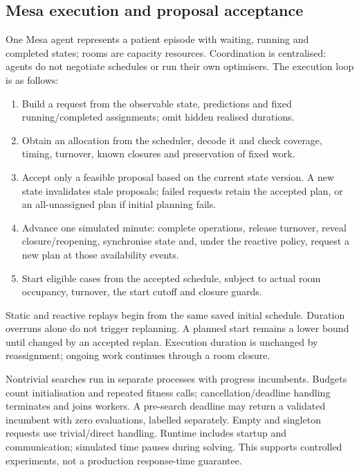 \subsection{Mesa execution and proposal acceptance}
\label{sec:coupling}

One Mesa agent represents a patient episode with waiting, running and
completed states; rooms are capacity resources. Coordination is centralised:
agents do not negotiate schedules or run their own optimisers. The execution
loop is as follows:
\begin{enumerate}
\item Build a request from the observable state, predictions and fixed
      running/completed assignments; omit hidden realised durations.
\item Obtain an allocation from the scheduler, decode it and check coverage,
      timing, turnover, known closures and preservation of fixed work.
\item Accept only a feasible proposal based on the current state version.
      A new state invalidates stale proposals; failed requests retain the
      accepted plan, or an all-unassigned plan if initial planning fails.
\item Advance one simulated minute: complete operations, release turnover,
      reveal closure/reopening, synchronise state and, under the reactive
      policy, request a new plan at those availability events.
\item Start eligible cases from the accepted schedule, subject to actual
      room occupancy, turnover, the start cutoff and closure guards.
\end{enumerate}
Static and reactive replays begin from the same saved initial schedule.
Duration overruns alone do not trigger replanning. A planned start remains
a lower bound until changed by an accepted replan. Execution duration is
unchanged by reassignment; ongoing work continues through a room closure.

Nontrivial searches run in separate processes with progress incumbents.
Budgets count initialisation and repeated fitness calls; cancellation/deadline
handling terminates and joins workers. A pre-search deadline may return a
validated incumbent with zero evaluations, labelled separately. Empty and
singleton requests use trivial/direct handling. Runtime includes startup and
communication; simulated time pauses during solving. This supports controlled
experiments, not a production response-time guarantee.
